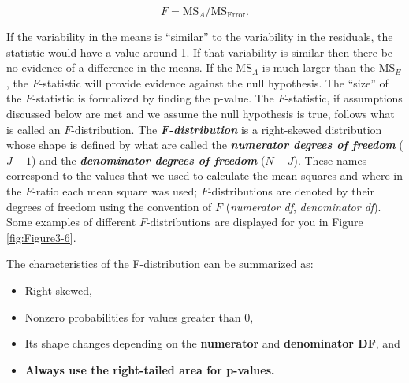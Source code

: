 \documentclass[]{book}
\begin{document}
\[F=\text{MS}_A/\text{MS}_{\text{Error}}.\]

If the variability in the means is ``similar'' to the variability in the
residuals, the statistic would have a value around 1. If that
variability is similar then there be no evidence of a difference in the
means. If the \(\text{MS}_A\) is much larger than the \(\text{MS}_E\),
the \(F\)-statistic will provide evidence against the null hypothesis.
The ``size'' of the \(F\)-statistic is formalized by finding the
p-value. The \(F\)-statistic, if assumptions discussed below are met and
we assume the null hypothesis is true, follows what is called an
\(F\)-distribution. The \textbf{\emph{F-distribution}} is a right-skewed
distribution whose shape is defined by what are called the
\textbf{\emph{numerator degrees of freedom}} (\(J-1\)) and the
\textbf{\emph{denominator degrees of freedom}} (\(N-J\)). These names
correspond to the values that we used to calculate the mean squares and
where in the \(F\)-ratio each mean square was used; \(F\)-distributions
are denoted by their degrees of freedom using the convention of \(F\)
(\emph{numerator df}, \emph{denominator df}). Some examples of different
\(F\)-distributions are displayed for you in Figure \ref{fig:Figure3-6}.

The characteristics of the F-distribution can be summarized as:

\begin{itemize}
\item
  Right skewed,
\item
  Nonzero probabilities for values greater than 0,
\item
  Its shape changes depending on the \textbf{numerator} and
  \textbf{denominator DF}, and
\item
  \textbf{Always use the right-tailed area for p-values.}
\end{itemize}
\end{document}
